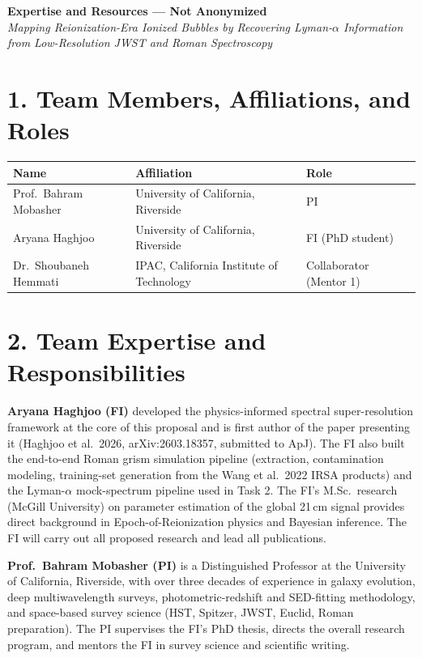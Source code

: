 \documentclass[12pt,letterpaper]{article}
\begin{document}
\begin{center}{\large\bfseries Expertise and Resources --- Not Anonymized}\\[3pt]
{\itshape Mapping Reionization-Era Ionized Bubbles by Recovering
Lyman-$\alpha$ Information from Low-Resolution JWST and Roman
Spectroscopy}
\end{center}

\section*{1. Team Members, Affiliations, and Roles}
\begin{center}
\begin{tabular}{lll}
\toprule
Name & Affiliation & Role \\
\midrule
Prof.\ Bahram Mobasher & University of California, Riverside & PI \\
Aryana Haghjoo & University of California, Riverside & FI (PhD student) \\
Dr.\ Shoubaneh Hemmati & IPAC, California Institute of Technology & Collaborator (Mentor 1) \\
\bottomrule
\end{tabular}
\end{center}

\section*{2. Team Expertise and Responsibilities}

\textbf{Aryana Haghjoo (FI)} developed the physics-informed spectral
super-resolution framework at the core of this proposal and is first
author of the paper presenting it (Haghjoo et al.\ 2026,
arXiv:2603.18357, submitted to ApJ). The FI also built the end-to-end
Roman grism simulation pipeline (extraction, contamination modeling,
training-set generation from the Wang et al.\ 2022 IRSA products) and the
Lyman-$\alpha$ mock-spectrum pipeline used in Task 2. The FI's M.Sc.\
research (McGill University) on parameter estimation of the global 21\,cm
signal provides direct background in Epoch-of-Reionization physics and
Bayesian inference. The FI will carry out all proposed research and lead
all publications.

\textbf{Prof.\ Bahram Mobasher (PI)} is a Distinguished Professor at the
University of California, Riverside, with over three decades of
experience in galaxy evolution, deep multiwavelength surveys,
photometric-redshift and SED-fitting methodology, and space-based survey
science (HST, Spitzer, JWST, Euclid, Roman preparation). The PI
supervises the FI's PhD thesis, directs the overall research program,
and mentors the FI in survey science and scientific writing.
\end{document}
